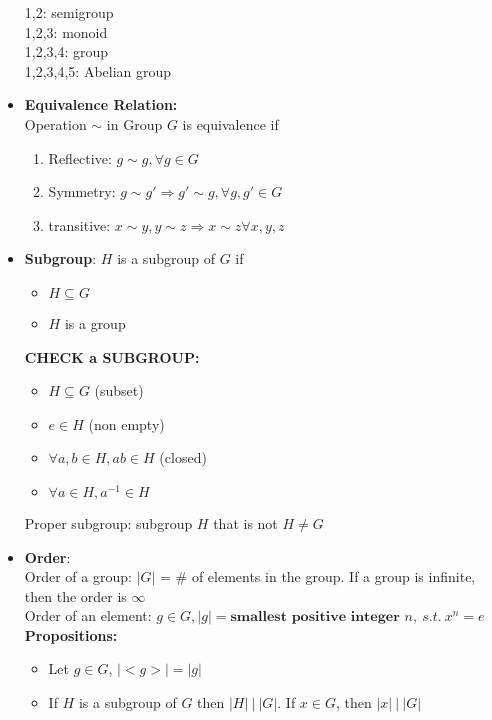 \documentclass[12pt]{article}
\begin{document}
\begin{itemize}
        1,2: semigroup\\
        1,2,3: monoid\\
        1,2,3,4: group\\
        1,2,3,4,5: Abelian group
        \item \textbf{Equivalence Relation:}\\
        Operation $\sim$ in Group $G$ is equivalence if 
        \begin{enumerate}
            \item Reflective: $g \sim g, \forall g \in G$
            \item Symmetry: $g \sim g' \Rightarrow g' \sim g, \forall g,g' \in G$
            \item transitive: $x \sim y, y \sim z \Rightarrow x \sim z \forall x,y,z$
        \end{enumerate}
        \item \textbf{Subgroup}: $H$ is a subgroup of $G$ if
        \begin{itemize}
            \item $H \subseteq G$
            \item $H$ is a group
        \end{itemize}
        \textbf{CHECK a SUBGROUP:}
        \begin{itemize}
            \item $H \subseteq G$ (subset)
            \item $e \in H$ (non empty)
            \item $\forall a,b \in H, ab \in H$ (closed)
            \item $\forall a \in H, a^{-1} \in H$
        \end{itemize}
        Proper subgroup: subgroup $H$ that is not $H \ne G$
        \item \textbf{Order}:\\
        Order of a group: $|G|$ = \# of elements in the group. If a group is infinite, then the order is $\infty$\\
        Order of an element: $g\in G, |g| = \textbf{smallest positive integer }n, \ s.t. \ x^n = e$\\
        \textbf{Propositions:}
        \begin{itemize}
            \item Let $g \in G$, $|<g>| = |g|$
            \item If $H$ is a subgroup of $G$ then $|H| \ | \ |G|$. If $x \in G$, then $|x| \ | \ |G|$
        \end{itemize}

\end{itemize}
\end{document}
